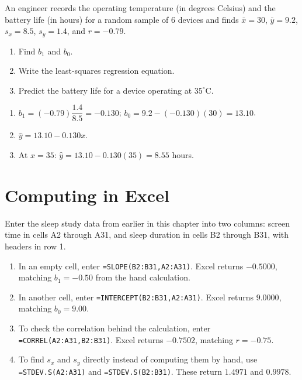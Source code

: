 \begin{Exercise}[title={Computing the Line}, label={ex:slope-model-3}]
An engineer records the operating temperature (in degrees Celsius) and the battery life (in hours) for a random sample of $6$ devices and finds $\bar{x} = 30$, $\bar{y} = 9.2$, $s_x = 8.5$, $s_y = 1.4$, and $r = -0.79$.
\begin{enumerate}
    \item Find $b_1$ and $b_0$.
    \item Write the least-squares regression equation.
    \item Predict the battery life for a device operating at $35^\circ$C.
\end{enumerate}
\end{Exercise}

\begin{Answer}[ref={ex:slope-model-3}]
\begin{enumerate}
    \item $b_1 = (-0.79)\dfrac{1.4}{8.5} = -0.130$; $b_0 = 9.2 - (-0.130)(30) = 13.10$.
    \item $\hat{y} = 13.10 - 0.130x$.
    \item At $x = 35$: $\hat{y} = 13.10 - 0.130(35) = 8.55$ hours.
\end{enumerate}
\end{Answer}

\section{Computing in Excel}

Enter the sleep study data from earlier in this chapter into two columns: screen time in cells A2 through A31, and sleep duration in cells B2 through B31, with headers in row 1.

\begin{enumerate}
    \item In an empty cell, enter \texttt{=SLOPE(B2:B31,A2:A31)}. Excel returns $-0.5000$, matching $b_1 = -0.50$ from the hand calculation.
    \item In another cell, enter \texttt{=INTERCEPT(B2:B31,A2:A31)}. Excel returns $9.0000$, matching $b_0 = 9.00$.
    \item To check the correlation behind the calculation, enter \texttt{=CORREL(A2:A31,B2:B31)}. Excel returns $-0.7502$, matching $r = -0.75$.
    \item To find $s_x$ and $s_y$ directly instead of computing them by hand, use \texttt{=STDEV.S(A2:A31)} and \texttt{=STDEV.S(B2:B31)}. These return $1.4971$ and $0.9978$.
\end{enumerate}

